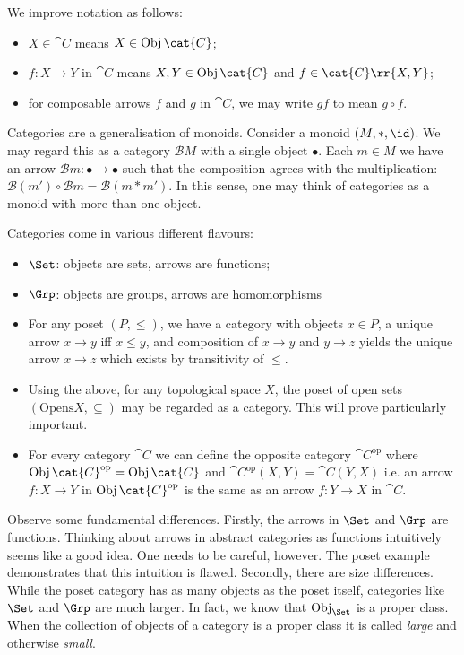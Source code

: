 \documentclass{article}
\begin{document}
\begin{notation}
  We improve notation as follows:
  \begin{itemize}
    \item $X\in\cat{C}$ means $X\in\Obj\cat{C}$;
    \item $f:X\to Y$ in $\cat{C}$ means $X,Y\in\Obj\cat{C}$ and $f\in\cat{C}\rr{X,Y}$;
    \item for composable arrows $f$ and $g$ in $\cat{C}$, we may write $gf$ to mean $g\circ f$.
  \end{itemize}
\end{notation}

Categories are a generalisation of monoids. Consider a monoid $(M,*,\id)$. We
may regard this as a category $\mathcal B M$ with a single object $\bullet$.
Each $m\in M$ we have an arrow $\mathcal B m:\bullet\to\bullet$ such that the
composition agrees with the multiplication: $\mathcal B(m')\circ\mathcal Bm =
\mathcal B(m * m')$. In this sense, one may think of categories as a monoid
with more than one object.

\begin{example}
  Categories come in various different flavours:
  \begin{itemize}
    \item $\Set$: objects are sets, arrows are functions;
    \item $\Grp$: objects are groups, arrows are homomorphisms
    \item For any poset $(P,\leq)$, we have a category with objects $x\in P$,
      a unique arrow $x\to y$ iff $x\leq y$, and composition of $x\to y$ and
      $y\to z$ yields the unique arrow $x\to z$ which exists by transitivity
      of $\leq$.
    \item Using the above, for any topological space $X$, the poset of open sets
      $(\text{Opens}X, \subseteq)$ may be regarded as a category. This will prove
      particularly important.
    \item For every category $\cat{C}$ we can define the opposite category $\cat{C}^{\text{op}}$
      where $\Obj {\cat{C}^{\text{op}}} = \Obj {\cat{C}}$ and 
      $\cat{C}^{\text{op}}(X, Y) = \cat{C}(Y,X)$ i.e. an arrow $f: X \to Y$ 
      in $\Obj {\cat{C}^{\text{op}}}$ is the same as an arrow $f : Y \to X$
      in $\cat{C}$.
  \end{itemize}
\end{example}

Observe some fundamental differences. Firstly, the arrows in $\Set$ and $\Grp$
are functions. Thinking about arrows in abstract categories as functions
intuitively seems like a good idea. One needs to be careful, however. The poset
example demonstrates that this intuition is flawed. Secondly, there are size
differences. While the poset category has as many objects as the poset itself,
categories like $\Set$ and $\Grp$ are much larger. In fact, we know that
$\Obj_{\Set}$ is a proper class. When the collection of objects of a category
is a proper class it is called \emph{large} and otherwise \emph{small}.
\end{document}
